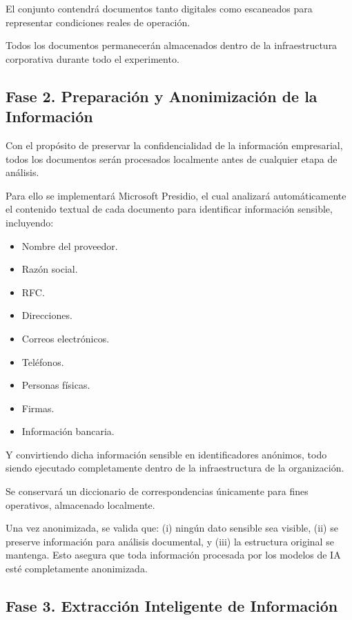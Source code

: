 \documentclass[12pt]{article}
\begin{document}
El conjunto contendrá documentos tanto digitales como escaneados para representar condiciones reales de operación.

Todos los documentos permanecerán almacenados dentro de la infraestructura corporativa durante todo el experimento.

\subsection{Fase 2. Preparación y Anonimización de la Información}
Con el propósito de preservar la confidencialidad de la información empresarial, todos los documentos serán procesados localmente antes de cualquier etapa de análisis. 

Para ello se implementará Microsoft Presidio, el cual analizará automáticamente el contenido textual de cada documento para identificar información sensible, incluyendo:

\begin{itemize}
    \item Nombre del proveedor.
    \item Razón social.
    \item RFC.
    \item Direcciones.
    \item Correos electrónicos.
    \item Teléfonos.
    \item Personas físicas.
    \item Firmas.
    \item Información bancaria.
\end{itemize}

Y convirtiendo dicha información sensible en identificadores anónimos, todo siendo ejecutado completamente dentro de la infraestructura de la organización.

Se conservará un diccionario de correspondencias únicamente para fines operativos, almacenado localmente.

Una vez anonimizada, se valida que: (i) ningún dato sensible sea visible, (ii) se preserve información para análisis documental, y (iii) la estructura original se mantenga. Esto asegura que toda información procesada por los modelos de IA esté completamente anonimizada.

\subsection{Fase 3. Extracción Inteligente de Información}
\end{document}
